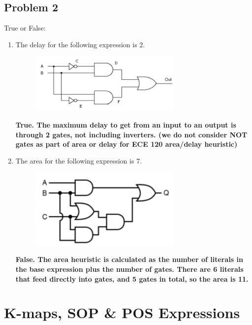 \documentclass{article}
\begin{document}
\subsection*{Problem 2}
True or False:
\begin{enumerate}[label=\alph*.]
    \item The delay for the following expression is 2.

    \begin{figure}[!h]
        \centering
        \includegraphics[width=0.7\textwidth]{figures/boolean2a.png}
    \end{figure}

\textbf{True. The maximum delay to get from an input to an output is through 2 gates, not including inverters. (we do not consider NOT gates as part of area or delay for ECE 120 area/delay heuristic)} 
    
    \item The area for the following expression is 7.

    \begin{figure}[!h]
        \centering
        \includegraphics[width=0.7\textwidth]{figures/boolean2b.png}
    \end{figure}

\textbf{False. The area heuristic is calculated as the number of literals in the base expression plus the number of gates. There are 6 literals that feed directly into gates, and 5 gates in total, so the area is 11.}
    
\end{enumerate}

\newpage
\section*{K-maps, SOP \& POS Expressions}
\end{document}
